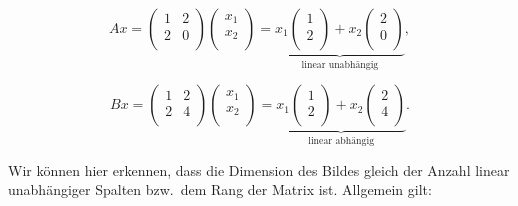 \begin{equation*}
    Ax =
    \begin{pmatrix}
        1 & 2 \\
        2 & 0 \\
    \end{pmatrix}
    \begin{pmatrix}
        x_1 \\
        x_2 \\
    \end{pmatrix} = \underbrace{ x_1
    \begin{pmatrix}
        1 \\
        2 \\
    \end{pmatrix} + x_2
    \begin{pmatrix}
        2 \\
        0 \\
    \end{pmatrix}}_{\text{linear unabhängig}},
\end{equation*}

\vspace{0.25\baselineskip}

\begin{equation*}
    Bx =
    \begin{pmatrix}
        1 & 2 \\
        2 & 4 \\
    \end{pmatrix}
    \begin{pmatrix}
        x_1 \\
        x_2 \\
    \end{pmatrix} = \underbrace{ x_1
    \begin{pmatrix}
        1 \\
        2 \\
    \end{pmatrix} + x_2
    \begin{pmatrix}
        2 \\
        4 \\
    \end{pmatrix}}_{\text{linear abhängig}}.
\end{equation*}

\vspace{0.25\baselineskip}

Wir können hier erkennen, dass die Dimension des Bildes gleich der Anzahl linear unabhängiger Spalten bzw.\ dem Rang der Matrix ist. Allgemein gilt:

